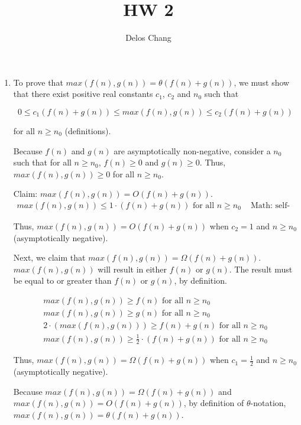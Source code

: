\documentclass[a4paper]{report}
\title{HW 2}
\author{Delos Chang}
\date{}
\begin{document}
  \begin{enumerate}
    \item To prove that $max(f(n),g(n)) = \theta (f(n) + g(n))$, we must show that there exist positive real constants $c_{1}$, $c_{2}$ and $n_{0}$ such that

      $$0 \leq c_{1}(f(n) + g(n)) \leq max(f(n),g(n)) \leq c_{2}(f(n) + g(n))$$
    
    for all $n \geq n_{0}$ (definitions). 

    Because $f(n)$ and $g(n)$ are asymptotically non-negative, 
    consider a $n_{0}$ such that for all $n \geq n_{0}$, $f(n) \geq 0$ and $g(n) \geq 0$. Thus, $max(f(n),g(n)) \geq 0$ for all $n \geq n_{0}$.

    Claim: $max(f(n), g(n)) = O(f(n) + g(n))$.
    \begin{align}
      max(f(n), g(n)) \leq 1 \cdot (f(n) + g(n)) \text{ for all } n \geq n_{0}              &&\text{ Math: self-evident}
    \end{align}

    Thus, $max(f(n), g(n)) = O(f(n) + g(n))$ when $c_{2} = 1$ and $n \geq n_{0}$ (asymptotically negative). 

    Next, we claim that $max(f(n), g(n)) = \Omega(f(n) + g(n))$. $max(f(n), g(n))$ will result in either $f(n)$ or $g(n)$. The result must be equal to or greater than $f(n)$ or $g(n)$, by definition.

    \setcounter{equation}{0}
    \begin{align}
      max(f(n), g(n)) \geq  f(n) \text { for all } n \geq n_{0}                         \\
      max(f(n), g(n)) \geq  g(n)  \text { for all } n \geq n_{0}                         \\
      2 \cdot (max(f(n),g(n))) \geq f(n) + g(n) \text { for all } n \geq n_{0}               \\
      max(f(n),g(n)) \geq \frac{1}{2} \cdot (f(n) + g(n)) \text { for all } n \geq n_{0}       
    \end{align}

    Thus, $max(f(n), g(n)) = \Omega(f(n) + g(n))$ when $c_{1} = \frac{1}{2}$ and $n \geq n_{0}$ (asymptotically negative).

    Because $max(f(n), g(n)) = \Omega(f(n) + g(n))$ and $max(f(n), g(n)) = O(f(n) + g(n))$, by definition of $\theta$-notation, $max(f(n), g(n)) = \theta(f(n) + g(n))$.


\end{enumerate}
\end{document}

